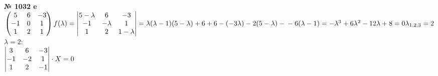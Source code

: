 \documentclass[12pt]{article}
\newenvironment{task}[1][0]{\vspace{.5cm} {\textbf{№ #1} \vspace{.5cm}\\ }}{}
\begin{document}
\begin{task}[1032 e]
	$
	\begin{pmatrix}
		5 & 6 & -3\\
		-1 & 0 & 1\\
		1 & 2 & 1\\
	\end{pmatrix}\\
	f(\lambda) = 
	\begin{vmatrix}
		5 - \lambda & 6 & -3\\
		-1 & -\lambda & 1\\
		1 & 2 & 1-\lambda\\
	\end{vmatrix} = \lambda(\lambda-1)(5-\lambda) + 6+6-(-3\lambda)-2(5-\lambda)-\\-6(\lambda-1)=
	-\lambda^3 +6\lambda^2-12\lambda+8=0\\
	\lambda_{1,2,3}=2\\
	$\\
	$\lambda = 2$:\\
	$
\begin{vmatrix}
	3 & 6 & -3\\
	-1 & -2 & 1\\
	1 & 2 & -1\\
\end{vmatrix} \cdot X = 0\\
$


\end{task}
\end{document}

